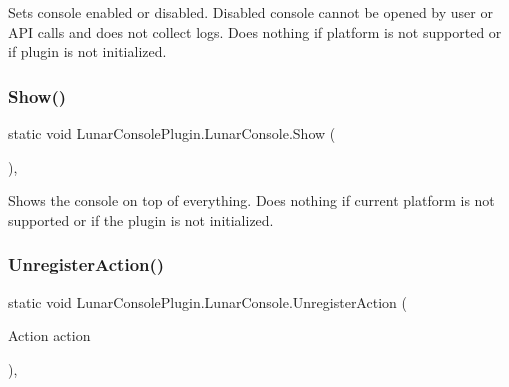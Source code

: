 Sets console enabled or disabled. Disabled console cannot be opened by user or A\+PI calls and does not collect logs. Does nothing if platform is not supported or if plugin is not initialized. 

\mbox{\label{class_lunar_console_plugin_1_1_lunar_console_a2739ddde546c2989facf03fb0985009d}} 
\subsubsection{\texorpdfstring{Show()}{Show()}}
{\footnotesize\ttfamily static void Lunar\+Console\+Plugin.\+Lunar\+Console.\+Show (\begin{DoxyParamCaption}{ }\end{DoxyParamCaption})\hspace{0.3cm}{\ttfamily [inline]}, {\ttfamily [static]}}



Shows the console on top of everything. Does nothing if current platform is not supported or if the plugin is not initialized. 

\mbox{\label{class_lunar_console_plugin_1_1_lunar_console_a4466fffbb7a8099d99e835e5fb36b029}} 
\subsubsection{\texorpdfstring{Unregister\+Action()}{UnregisterAction()}\hspace{0.1cm}{\footnotesize\ttfamily [1/2]}}
{\footnotesize\ttfamily static void Lunar\+Console\+Plugin.\+Lunar\+Console.\+Unregister\+Action (\begin{DoxyParamCaption}\item[{Action}]{action }\end{DoxyParamCaption})\hspace{0.3cm}{\ttfamily [inline]}, {\ttfamily [static]}}



